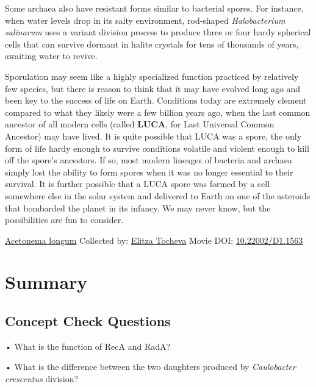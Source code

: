 \documentclass[]{tufte-book}
\begin{document}
Some archaea also have resistant forms similar to bacterial spores. For instance, when water levels drop in its salty environment, rod-shaped \emph{Halobacterium salinarum} uses a variant division process to produce three or four hardy spherical cells that can survive dormant in halite crystals for tens of thousands of years, awaiting water to revive.

Sporulation may seem like a highly specialized function practiced by relatively few species, but there is reason to think that it may have evolved long ago and been key to the success of life on Earth. Conditions today are extremely clement compared to what they likely were a few billion years ago, when the last common ancestor of all modern cells (called \textbf{LUCA}, for Last Universal Common Ancestor) may have lived. It is quite possible that LUCA was a spore, the only form of life hardy enough to survive conditions volatile and violent enough to kill off the spore's ancestors. If so, most modern lineages of bacteria and archaea simply lost the ability to form spores when it was no longer essential to their survival. It is further possible that a LUCA spore was formed by a cell somewhere else in the solar system and delivered to Earth on one of the asteroids that bombarded the planet in its infancy. We may never know, but the possibilities are fun to consider.



\hypertarget{htmlwidget-115f83e01250a348e15d}{}

\label{fig:8-11}\protect\hyperlink{tree}{Acetonema longum} Collected by: \protect\hyperlink{elitza_tocheva}{Elitza Tocheva} Movie DOI: \href{https://doi.org/10.22002/D1.1563}{10.22002/D1.1563}

\hypertarget{summary-7}{%
\section{Summary}\label{summary-7}}

\hypertarget{concept-check-questions-7}{%
\subsection*{Concept Check Questions}\label{concept-check-questions-7}}

• What is the function of RecA and RadA?

• What is the difference between the two daughters produced by \emph{Caulobacter crescentus} division?
\end{document}
